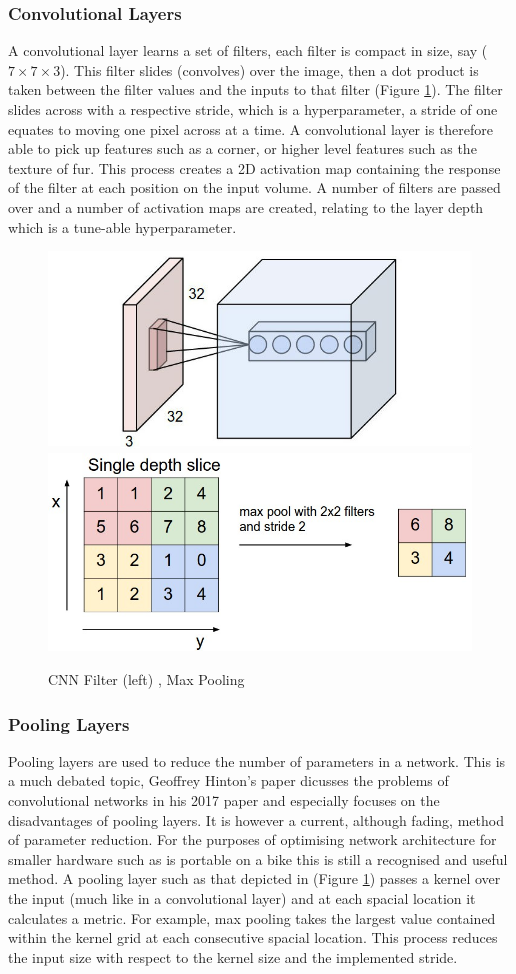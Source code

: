 \documentclass[a4paper,11pt,notitlepage]{article}
\begin{document}
\subsubsection{Convolutional Layers}
A convolutional layer learns a set of filters, each filter is compact in size, say ($7 \times 7 \times 3$). This filter slides (convolves) over the image, then a dot product is taken between the filter values and the inputs to that filter (Figure \ref{CNN_filter}). The filter slides across with a respective stride, which is a hyperparameter, a stride of one equates to moving one pixel across at a time. A convolutional layer is therefore able to pick up features such as a corner, or higher level features such as the texture of fur. This process creates a 2D activation map containing the response of the filter at each position on the input volume. A number of filters are passed over and a number of activation maps are created, relating to the layer depth which is a tune-able hyperparameter.

\noindent \begin{figure}[h!]
\includegraphics[width = 0.5\hsize]{./figures/conv_filter.jpg}
\includegraphics[width = 0.5\hsize]{./figures/maxpool.jpeg}
\caption{CNN Filter (left) \cite{StanfordCS231_conv_filter}, Max Pooling \cite{StanfordCS231_max_pool}}
\label{CNN_filter}
\end{figure}

\subsubsection{Pooling Layers}
Pooling layers are used to reduce the number of parameters in a network. This is a much debated topic, Geoffrey Hinton's paper \cite{DBLP:journals/corr/abs-1710-09829} dicusses the problems of convolutional networks in his 2017 paper and especially focuses on the disadvantages of pooling layers. It is however a current, although fading, method of parameter reduction. For the purposes of optimising network architecture for smaller hardware such as is portable on a bike this is still a recognised and useful method.
\newline \newline
A pooling layer such as that depicted in (Figure \ref{CNN_filter}) passes a kernel over the input (much like in a convolutional layer) and at each spacial location it calculates a metric. For example, max pooling takes the largest value contained within the kernel grid at each consecutive spacial location. This process reduces the input size with respect to the kernel size and the implemented stride.
\end{document}
